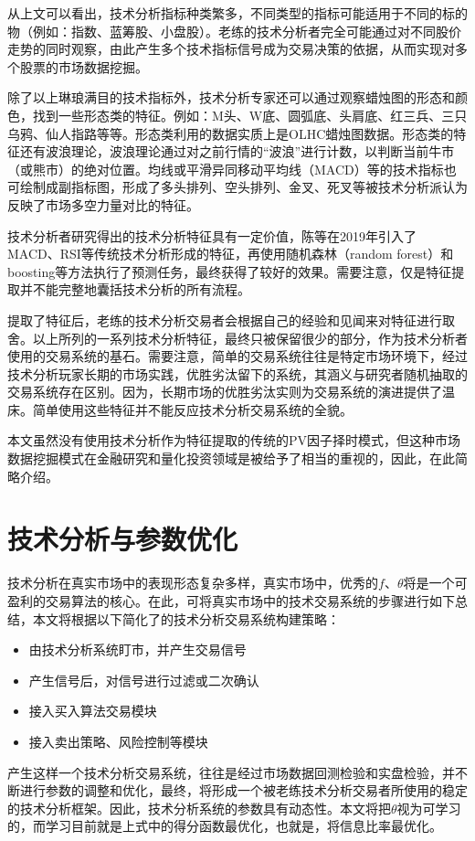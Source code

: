 \documentclass[twoside,longtitle]{LZUthesis}
\begin{document}
从上文可以看出，技术分析指标种类繁多，不同类型的指标可能适用于不同的标的物（例如：指数、蓝筹股、小盘股）。老练的技术分析者完全可能通过对不同股价走势的同时观察，由此产生多个技术指标信号成为交易决策的依据，从而实现对多个股票的市场数据挖掘。

除了以上琳琅满目的技术指标外，技术分析专家还可以通过观察蜡烛图的形态和颜色，找到一些形态类的特征。例如：M头、W底、圆弧底、头肩底、红三兵、三只乌鸦、仙人指路等等。形态类利用的数据实质上是OLHC蜡烛图数据。形态类的特征还有波浪理论，波浪理论通过对之前行情的“波浪”进行计数，以判断当前牛市（或熊市）的绝对位置。均线或平滑异同移动平均线（MACD）等的技术指标也可绘制成副指标图，形成了多头排列、空头排列、金叉、死叉等被技术分析派认为反映了市场多空力量对比的特征。

技术分析者研究得出的技术分析特征具有一定价值，陈等在2019年引入了MACD、RSI等传统技术分析形成的特征\cite{chenfangfang2019}，再使用随机森林（random forest）和boosting等方法执行了预测任务，最终获得了较好的效果。需要注意，仅是特征提取并不能完整地囊括技术分析的所有流程。

提取了特征后，老练的技术分析交易者会根据自己的经验和见闻来对特征进行取舍。以上所列的一系列技术分析特征，最终只被保留很少的部分，作为技术分析者使用的交易系统的基石。需要注意，简单的交易系统往往是特定市场环境下，经过技术分析玩家长期的市场实践，优胜劣汰留下的系统，其涵义与研究者随机抽取的交易系统存在区别。因为，长期市场的优胜劣汰实则为交易系统的演进提供了温床。简单使用这些特征并不能反应技术分析交易系统的全貌。

本文虽然没有使用技术分析作为特征提取的传统的PV因子择时模式，但这种市场数据挖掘模式在金融研究和量化投资领域是被给予了相当的重视的，因此，在此简略介绍。

\section{技术分析与参数优化}

技术分析在真实市场中的表现形态复杂多样，真实市场中，优秀的$f$、$\theta$将是一个可盈利的交易算法的核心。在此，可将真实市场中的技术交易系统的步骤进行如下总结，本文将根据以下简化了的技术分析交易系统构建策略：
\begin{itemize}
	\item 由技术分析系统盯市，并产生交易信号
	\item 产生信号后，对信号进行过滤或二次确认
	\item 接入买入算法交易模块
	\item 接入卖出策略、风险控制等模块
\end{itemize}
产生这样一个技术分析交易系统，往往是经过市场数据回测检验和实盘检验，并不断进行参数的调整和优化，最终，将形成一个被老练技术分析交易者所使用的稳定的技术分析框架。因此，技术分析系统的参数具有动态性。本文将把$\theta$视为可学习的，而学习目前就是上式中的得分函数最优化，也就是，将信息比率最优化。
\end{document}

